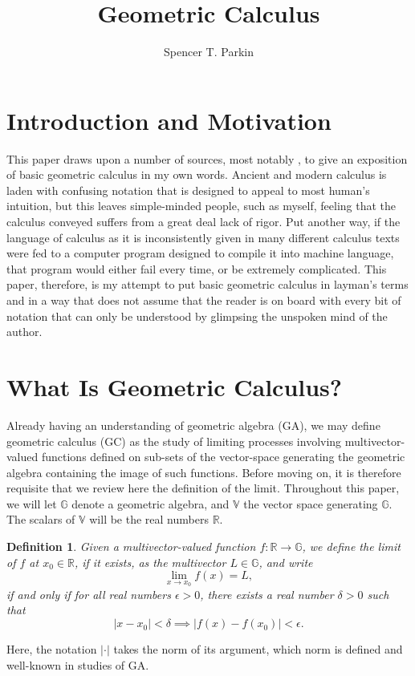 \documentclass[12pt]{article}
\title{Geometric Calculus}
\author{Spencer T. Parkin}
\newcommand{\G}{\mathbb{G}}
\newcommand{\V}{\mathbb{V}}
\newcommand{\R}{\mathbb{R}}
\newtheorem{definition}{Definition}[section]
\begin{document}
\maketitle

\section{Introduction and Motivation}

This paper draws upon a number of sources, most notably
\cite{}, to give an exposition of basic geometric calculus
in my own words.  Ancient and modern calculus is laden with
confusing notation that is designed to appeal to most human's
intuition, but this leaves simple-minded people, such as myself, feeling
that the calculus conveyed suffers from a great deal lack of rigor.  Put another way,
if the language of calculus as it is inconsistently given in many
different calculus texts were fed to a computer program designed
to compile it into machine language, that program would either fail
every time, or be extremely complicated.
This paper, therefore, is my attempt to put basic geometric calculus in layman's terms
and in a way that does not assume that the reader is on board with every bit
of notation that can only be understood by glimpsing the unspoken mind of the author.

\section{What Is Geometric Calculus?}

Already having an understanding of geometric algebra (GA), we may define
geometric calculus (GC) as the study of limiting processes involving multivector-valued functions
defined on sub-sets of the vector-space generating the geometric algebra containing the
image of such functions.  Before moving on, it is therefore
requisite that we review here the definition of the limit.
Throughout this paper, we will let $\G$ denote a geometric algebra, and $\V$
the vector space generating $\G$.  The scalars of $\V$ will be the real numbers $\R$.
\begin{definition}\label{def_scalar_limit}
Given a multivector-valued function $f:\R\to\G$, we define the limit of $f$ at
$x_0\in\R$, if it exists, as the multivector $L\in\G$, and write
\begin{equation}
\lim_{x\to x_0} f(x) = L,
\end{equation}
if and only if for all real numbers $\epsilon>0$, there exists a real number $\delta>0$ such that
\begin{equation}
|x-x_0|<\delta \implies |f(x)-f(x_0)|<\epsilon.
\end{equation}
\end{definition}
Here, the notation $|\cdot |$ takes the norm of its argument, which norm
is defined and well-known in studies of GA.
\end{document}
